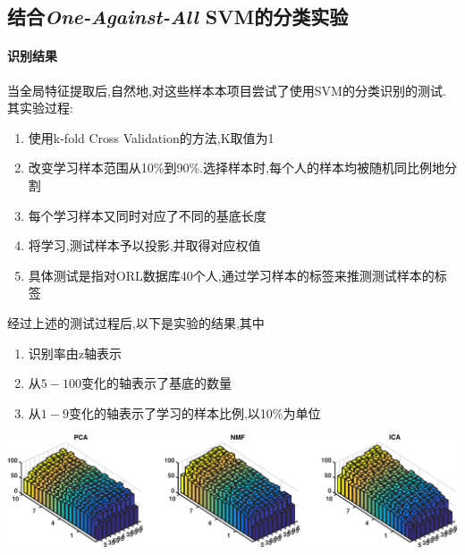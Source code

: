 
\subsection{结合\textit{One-Against-All} SVM的分类实验}
\paragraph{识别结果} 当全局特征提取后,自然地,对这些样本本项目尝试了使用SVM的分类识别的测试.其实验过程:
	\begin{enumerate}
		\item 使用k-fold Cross Validation的方法,K取值为1
		\item 改变学习样本范围从10\%到90\%.选择样本时,每个人的样本均被随机同比例地分割
		\item 每个学习样本又同时对应了不同的基底长度
		\item 将学习,测试样本予以投影,并取得对应权值
		\item 具体测试是指对ORL数据库40个人,通过学习样本的标签来推测测试样本的标签
	\end{enumerate}
	
	
	经过上述的测试过程后,以下是实验的结果,其中
	\begin{enumerate}
		\item 识别率由z轴表示
		\item 从$5-100$变化的轴表示了基底的数量
		\item 从$1-9$变化的轴表示了学习的样本比例,以10\%为单位
	\end{enumerate}
	
	\begin{center}
	\begin{minipage}[t]{\linewidth}
	\center
	{
	\includegraphics[width=\textwidth]{Img/svm_pni} 
	}
	\end{minipage}
	\medskip
	\end{center}

